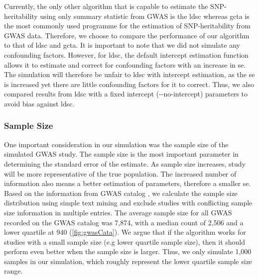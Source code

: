 		Currently, the only other algorithm that is capable to estimate the \gls{SNP}-heritability using only summary statistic from \gls{GWAS} is the \gls{ldsc} \citep{Bulik-Sullivan2015} whereas \gls{gcta} \citep{Yang2011} is the most commonly used programme for the estimation of \gls{SNP}-heritability from \gls{GWAS} data. 
		Therefore, we choose to compare the performance of our algorithm to that of \gls{ldsc} and \gls{gcta}.
		It is important to note that we did not simulate any confounding factors.
		However, for \gls{ldsc}, the default intercept estimation function allows it to estimate and correct for confounding factors with an increase in \gls{se}. 
		The simulation will therefore be unfair to \gls{ldsc} with intercept estimation, as the \gls{se} is increased yet there are little confounding factors for it to correct.
		Thus, we also compared results from \gls{ldsc} with a fixed intercept (-{}-no-intercept) parameters to avoid bias against \gls{ldsc}.	
		
		\subsubsection{Sample Size}
			One important consideration in our simulation was the sample size of the simulated \gls{GWAS} study. 
			The sample size is the most important parameter in determining the standard error of the estimate. 
			As sample size increases, study will be more representative of the true population. 
			The increased number of information also means a better estimation of parameters, therefore a smaller \acrfull{se}.
			Based on the information from \gls{GWAS} catalog \citep{Welter2014}, we calculate the sample size distribution using simple text mining and exclude studies with conflicting sample size information in multiple entries. 
			The average sample size for all \gls{GWAS} recorded on the \gls{GWAS} catalog was 7,874, with a median count of 2,506 and a lower quartile at 940 (\cref{fig:gwasCata}). 
			We argue that if the algorithm works for studies with a small sample size (e.g lower quartile sample size), then it should perform even better when the sample size is larger. 
			Thus, we only simulate 1,000 samples in our simulation, which roughly represent the lower quartile sample size range.
				
